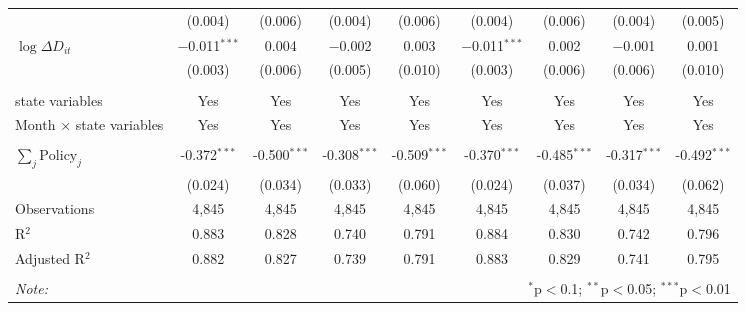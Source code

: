 \begin{tabular}{@{\extracolsep{1pt}}lcccccccc}
  & (0.004) & (0.006) & (0.004) & (0.006) & (0.004) & (0.006) & (0.004) & (0.005) \\ 
  $\log \Delta D_{it}$ & $-$0.011$^{***}$ & 0.004 & $-$0.002 & 0.003 & $-$0.011$^{***}$ & 0.002 & $-$0.001 & 0.001 \\ 
  & (0.003) & (0.006) & (0.005) & (0.010) & (0.003) & (0.006) & (0.006) & (0.010) \\ 
 \hline \\[-1.8ex] 
state variables & Yes & Yes & Yes & Yes & Yes & Yes & Yes & Yes \\ 
Month $\times$ state variables & Yes & Yes & Yes & Yes & Yes & Yes & Yes & Yes \\ 
\hline \\[-1.8ex] 
$\sum_j \mathrm{Policy}_j$ & -0.372$^{***}$ & -0.500$^{***}$ & -0.308$^{***}$ & -0.509$^{***}$ & -0.370$^{***}$ & -0.485$^{***}$ & -0.317$^{***}$ & -0.492$^{***}$ \\ 
 & (0.024) & (0.034) & (0.033) & (0.060) & (0.024) & (0.037) & (0.034) & (0.062) \\ 
Observations & 4,845 & 4,845 & 4,845 & 4,845 & 4,845 & 4,845 & 4,845 & 4,845 \\ 
R$^{2}$ & 0.883 & 0.828 & 0.740 & 0.791 & 0.884 & 0.830 & 0.742 & 0.796 \\ 
Adjusted R$^{2}$ & 0.882 & 0.827 & 0.739 & 0.791 & 0.883 & 0.829 & 0.741 & 0.795 \\ 
\hline 
\hline \\[-1.8ex] 
\textit{Note:}  & \multicolumn{8}{r}{$^{*}$p$<$0.1; $^{**}$p$<$0.05; $^{***}$p$<$0.01} \\ 
\end{tabular} 